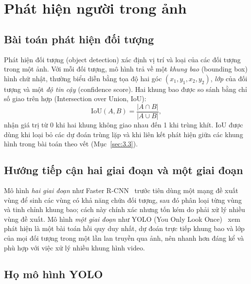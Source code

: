 \section{Phát hiện người trong ảnh}
\label{sec:3.2}

\subsection{Bài toán phát hiện đối tượng}
\label{sec:3.2.1}

Phát hiện đối tượng (object detection) xác định vị trí và loại của các đối tượng trong một ảnh. Với mỗi đối tượng, mô hình trả về một \emph{khung bao} (bounding box) hình chữ nhật, thường biểu diễn bằng tọa độ hai góc $(x_1, y_1, x_2, y_2)$, \emph{lớp} của đối tượng và một \emph{độ tin cậy} (confidence score). Hai khung bao được so sánh bằng chỉ số giao trên hợp (Intersection over Union, IoU):
\begin{equation}
    \mathrm{IoU}(A, B) = \frac{|A \cap B|}{|A \cup B|},
    \label{eq:iou}
\end{equation}
nhận giá trị từ 0 khi hai khung không giao nhau đến 1 khi trùng khít. IoU được dùng khi loại bỏ các dự đoán trùng lặp và khi liên kết phát hiện giữa các khung hình trong bài toán theo vết (Mục~\ref{sec:3.3}).

\subsection{Hướng tiếp cận hai giai đoạn và một giai đoạn}
\label{sec:3.2.2}

Mô hình \emph{hai giai đoạn} như Faster R-CNN~\cite{ren2017fasterrcnn} trước tiên dùng một mạng đề xuất vùng để sinh các vùng có khả năng chứa đối tượng, sau đó phân loại từng vùng và tinh chỉnh khung bao; cách này chính xác nhưng tốn kém do phải xử lý nhiều vùng đề xuất. Mô hình \emph{một giai đoạn} như YOLO (You Only Look Once)~\cite{redmon2016yolo} xem phát hiện là một bài toán hồi quy duy nhất, dự đoán trực tiếp khung bao và lớp của mọi đối tượng trong một lần lan truyền qua ảnh, nên nhanh hơn đáng kể và phù hợp với việc xử lý nhiều khung hình video.

\subsection{Họ mô hình YOLO}
\label{sec:3.2.3}

